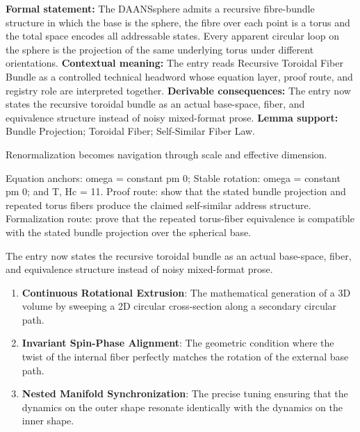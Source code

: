 \begingroup\footnotesize\setlength{\emergencystretch}{3em}\sloppy
\textbf{Formal statement:} The DAANSsphere admits a recursive fibre-bundle structure in which the base is the sphere, the fibre over each point is a torus and the total space encodes all addressable states. Every apparent circular loop on the sphere is the projection of the same underlying torus under different orientations. \textbf{Contextual meaning:} The entry reads Recursive Toroidal Fiber Bundle as a controlled technical headword whose equation layer, proof route, and registry role are interpreted together. \textbf{Derivable consequences:} The entry now states the recursive toroidal bundle as an actual base-space, fiber, and equivalence structure instead of noisy mixed-format prose. \textbf{Lemma support:} Bundle Projection; Toroidal Fiber; Self-Similar Fiber Law.\par
\endgroup

Renormalization becomes navigation through scale and effective dimension.

Equation anchors: omega = constant pm 0; Stable rotation: omega = constant pm 0; and T, Hc = 11. Proof route: show that the stated bundle projection and repeated torus fibers produce the claimed self-similar address structure. Formalization route: prove that the repeated torus-fiber equivalence is compatible with the stated bundle projection over the spherical base.

The entry now states the recursive toroidal bundle as an actual base-space, fiber, and equivalence structure instead of noisy mixed-format prose.
\endgroup

\begin{enumerate}[leftmargin=1.6em,itemsep=6pt,topsep=4pt]
\item \textbf{Continuous Rotational Extrusion}: The mathematical generation of a 3D volume by sweeping a 2D circular cross-section along a secondary circular path.
\item \textbf{Invariant Spin-Phase Alignment}: The geometric condition where the twist of the internal fiber perfectly matches the rotation of the external base path.
\item \textbf{Nested Manifold Synchronization}: The precise tuning ensuring that the dynamics on the outer shape resonate identically with the dynamics on the inner shape.
\end{enumerate}

